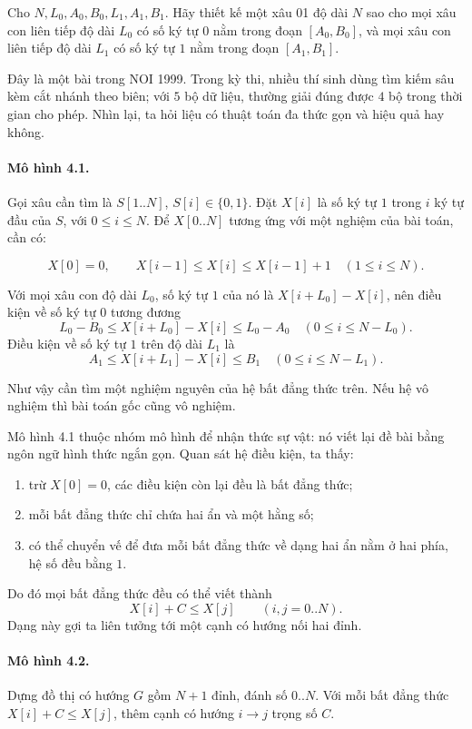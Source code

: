 \documentclass[11pt]{article}
\begin{document}
Cho $N,L_0,A_0,B_0,L_1,A_1,B_1$. Hãy thiết kế một xâu 01 độ dài $N$ sao cho
mọi xâu con liên tiếp độ dài $L_0$ có số ký tự $0$ nằm trong đoạn
$[A_0,B_0]$, và mọi xâu con liên tiếp độ dài $L_1$ có số ký tự $1$ nằm trong
đoạn $[A_1,B_1]$.

Đây là một bài trong NOI 1999. Trong kỳ thi, nhiều thí sinh dùng tìm kiếm sâu
kèm cắt nhánh theo biên; với $5$ bộ dữ liệu, thường giải đúng được $4$ bộ
trong thời gian cho phép. Nhìn lại, ta hỏi liệu có thuật toán đa thức gọn và
hiệu quả hay không.

\paragraph{Mô hình 4.1.}
Gọi xâu cần tìm là $S[1..N]$, $S[i]\in\{0,1\}$. Đặt $X[i]$ là số ký tự $1$
trong $i$ ký tự đầu của $S$, với $0\le i\le N$. Để $X[0..N]$ tương ứng với
một nghiệm của bài toán, cần có:

\[
X[0]=0,\qquad X[i-1]\le X[i]\le X[i-1]+1\quad (1\le i\le N).
\]

Với mọi xâu con độ dài $L_0$, số ký tự $1$ của nó là
$X[i+L_0]-X[i]$, nên điều kiện về số ký tự $0$ tương đương
\[
L_0-B_0\le X[i+L_0]-X[i]\le L_0-A_0\quad (0\le i\le N-L_0).
\]
Điều kiện về số ký tự $1$ trên độ dài $L_1$ là
\[
A_1\le X[i+L_1]-X[i]\le B_1\quad (0\le i\le N-L_1).
\]

Như vậy cần tìm một nghiệm nguyên của hệ bất đẳng thức trên. Nếu hệ vô
nghiệm thì bài toán gốc cũng vô nghiệm.

Mô hình 4.1 thuộc nhóm mô hình để nhận thức sự vật: nó viết lại đề bài bằng
ngôn ngữ hình thức ngắn gọn. Quan sát hệ điều kiện, ta thấy:

\begin{enumerate}
  \item trừ $X[0]=0$, các điều kiện còn lại đều là bất đẳng thức;
  \item mỗi bất đẳng thức chỉ chứa hai ẩn và một hằng số;
  \item có thể chuyển vế để đưa mỗi bất đẳng thức về dạng hai ẩn nằm ở hai
  phía, hệ số đều bằng $1$.
\end{enumerate}

Do đó mọi bất đẳng thức đều có thể viết thành
\[
X[i]+C\le X[j]\qquad (i,j=0..N).
\]
Dạng này gợi ta liên tưởng tới một cạnh có hướng nối hai đỉnh.

\paragraph{Mô hình 4.2.}
Dựng đồ thị có hướng $G$ gồm $N+1$ đỉnh, đánh số $0..N$. Với mỗi bất đẳng
thức $X[i]+C\le X[j]$, thêm cạnh có hướng $i\to j$ trọng số $C$.
\end{document}
